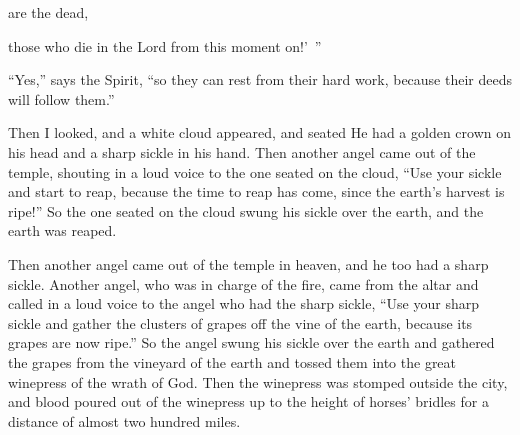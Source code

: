 {are the dead,
\par }{\Q those who die
in
the Lord
from
this moment
on!’ ”
\par }{\PP “Yes,”
says
the Spirit,
“so
they can rest
from
their
hard work,
because
their
deeds
will follow
them.”
\par }{\PP {}Then
I looked,
and
a white
cloud
appeared,
and
seated
{}
He had
a golden
crown
on
his
head
and
a sharp
sickle
in
his
hand.
Then
another
angel
came out
of
the temple,
shouting
in
a loud
voice
to the one seated
on
the cloud,
“Use
your
sickle
and
start to reap,
because
the time
to reap
has come,
since
the earth’s
harvest
is ripe!”
So the one seated
on
the cloud
swung
his
sickle
over
the earth,
and
the earth
was reaped.
\par }{\PP {}Then
another
angel
came out
of
the temple
in
heaven,
and
he
too had
a sharp
sickle.
Another
angel,
who was
in charge
of
the fire,
came
from
the altar
and
called
in a loud
voice
to the angel who had
the sharp
sickle,
“Use
your
sharp
sickle
and
gather
the clusters of grapes
off the
vine
of the
earth,
because
its
grapes
are now ripe.”
So
the angel
swung
his
sickle
over
the earth
and
gathered
the grapes
from the vineyard of the earth
and
tossed
them into
the great
winepress
of the wrath
of God.
Then
the winepress
was stomped
outside
the city,
and
blood
poured out
of
the winepress
up to the height of
horses’
bridles
for
a distance
of almost two hundred miles.

\par }
